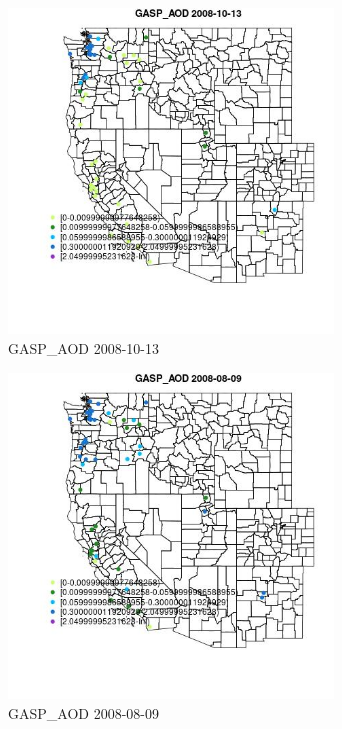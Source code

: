 \begin{figure} 
\centering  
\includegraphics[width=0.77\textwidth]{Code_Outputs/Report_ML_input_PM25_Step4_part_e_de_duplicated_aves_MapObsGASP_AOD2008-10-13.jpg} 
\caption{\label{fig:Report_ML_input_PM25_Step4_part_e_de_duplicated_avesMapObsGASP_AOD2008-10-13}GASP_AOD 2008-10-13} 
\end{figure} 
 

\begin{figure} 
\centering  
\includegraphics[width=0.77\textwidth]{Code_Outputs/Report_ML_input_PM25_Step4_part_e_de_duplicated_aves_MapObsGASP_AOD2008-08-09.jpg} 
\caption{\label{fig:Report_ML_input_PM25_Step4_part_e_de_duplicated_avesMapObsGASP_AOD2008-08-09}GASP_AOD 2008-08-09} 
\end{figure} 
 

